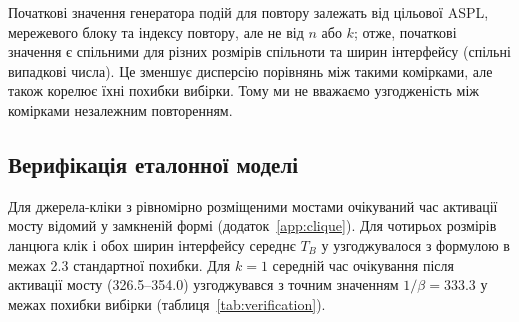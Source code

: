 Початкові значення генератора подій для повтору залежать від цільової ASPL, мережевого блоку та індексу повтору, але не від $n$ або $k$; отже, початкові значення є спільними для різних розмірів спільноти та ширин інтерфейсу (спільні випадкові числа). Це зменшує дисперсію порівнянь між такими комірками, але також корелює їхні похибки вибірки. Тому ми не вважаємо узгодженість між комірками незалежним повторенням.

\subsection{Верифікація еталонної моделі}

Для джерела-кліки з рівномірно розміщеними мостами очікуваний час активації мосту відомий у замкненій формі (додаток~\ref{app:clique}). Для чотирьох розмірів ланцюга клік і обох ширин інтерфейсу середнє $T_B$ у \Full{} узгоджувалося з формулою в межах 2.3 стандартної похибки. Для $k=1$ середній час очікування після активації мосту (326.5--354.0) узгоджувався з точним значенням $1/\beta=333.3$ у межах похибки вибірки (таблиця~\ref{tab:verification}).


